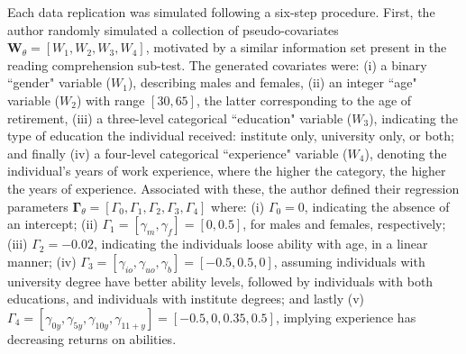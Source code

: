 Each data replication was simulated following a six-step procedure. First, the author randomly simulated a collection of pseudo-covariates $\mathbf{W}_{\theta} = [ W_{1}, W_{2}, W_{3}, W_{4} ]$, motivated by a similar information set present in the reading comprehension sub-test. The generated covariates were: (i) a binary ``gender" variable ($W_{1}$), describing males and females, (ii) an integer ``age" variable ($W_{2}$) with range $[30, 65]$, the latter corresponding to the age of retirement, (iii) a three-level categorical ``education" variable ($W_{3}$), indicating the type of education the individual received: institute only, university only, or both; and finally (iv) a four-level categorical ``experience" variable ($W_{4}$), denoting the individual's years of work experience, where the higher the category, the higher the years of experience. Associated with these, the author defined their regression parameters $\mathbf{\Gamma}_{\theta} = [\Gamma_{0}, \Gamma_{1}, \Gamma_{2}, \Gamma_{3}, \Gamma_{4}]$ where: (i) $\Gamma_{0} = 0$, indicating the absence of an intercept; (ii) $\Gamma_{1} = [\gamma_{m}, \gamma_{f}] = [0, 0.5]$, for males and females, respectively; (iii) $\Gamma_{2} = -0.02$, indicating the individuals loose ability with age, in a linear manner; (iv) $\Gamma_{3} = [\gamma_{io}, \gamma_{uo}, \gamma_{b}] = [-0.5, 0.5, 0]$, assuming individuals with university degree have better ability levels, followed by individuals with both educations, and individuals with institute degrees; and lastly (v) $\Gamma_{4} = [\gamma_{0y}, \gamma_{5y}, \gamma_{10y}, \gamma_{11+y}] = [-0.5, 0, 0.35, 0.5]$, implying experience has decreasing returns on abilities.

